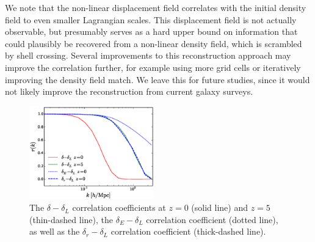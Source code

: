\documentclass[aps,prl,twocolumn,showpacs,superscriptaddress,groupedaddress,nofootinbib]{revtex4}  %
\newcommand{\mr}{\mathrm}
\begin{document}
We note that the
non-linear displacement field correlates with the initial density
field to even smaller Lagrangian scales.  This displacement field is
not actually observable, but presumably serves as a hard upper bound
on information that could plausibly be recovered from a non-linear
density field, which is scrambled by shell crossing.  Several
improvements to this reconstruction approach may improve the
correlation further, for example using more grid cells or iteratively
improving the density field match.  We leave this for future studies,
since it would not likely improve the reconstruction from current
galaxy surveys. 


\begin{figure}[tbp]
\begin{center}
\includegraphics[width=0.48\textwidth]{f3.eps}
\end{center}
\vspace{-0.7cm}
\caption{
The $\delta-\delta_L$ correlation coefficients at $z=0$ (solid
line) and $z=5$ (thin-dashed line), the $\delta_E-\delta_L$ correlation
coefficient (dotted line), as well as the $\delta_r-\delta_L$
correlation coefficient (thick-dashed line).}
    
\label{fig:xcc}
\end{figure}
\end{document}
